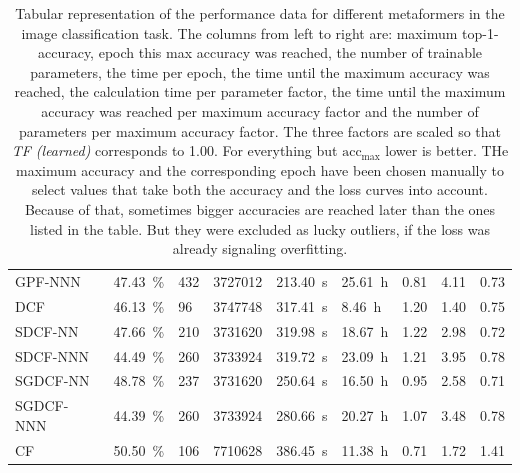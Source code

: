 \begin{table}[htbp]
{\begin{tabular}{l|llllllll}
            GPF-NNN & \SI{47.43}{\percent}  & \SI{432}{} & \SI{3727012}{} & \SI{213.40}{\second} & \SI{25.61}{\hour} & \SI{0.81}{} & \SI{4.11}{} & \SI{0.73}{} \\
            DCF & \SI{46.13}{\percent}  & \SI{96}{} & \SI{3747748}{} & \SI{317.41}{\second} & \SI{8.46}{\hour} & \SI{1.20}{} & \SI{1.40}{} & \SI{0.75}{} \\
            SDCF-NN & \SI{47.66}{\percent}  & \SI{210}{} & \SI{3731620}{} & \SI{319.98}{\second} & \SI{18.67}{\hour} & \SI{1.22}{} & \SI{2.98}{} & \SI{0.72}{} \\
            SDCF-NNN & \SI{44.49}{\percent}  & \SI{260}{} & \SI{3733924}{} & \SI{319.72}{\second} & \SI{23.09}{\hour} & \SI{1.21}{} & \SI{3.95}{} & \SI{0.78}{} \\
            SGDCF-NN & \SI{48.78}{\percent}  & \SI{237}{} & \SI{3731620}{} & \SI{250.64}{\second} & \SI{16.50}{\hour} & \SI{0.95}{} & \SI{2.58}{} & \SI{0.71}{} \\
            SGDCF-NNN & \SI{44.39}{\percent}  & \SI{260}{} & \SI{3733924}{} & \SI{280.66}{\second} & \SI{20.27}{\hour} & \SI{1.07}{} & \SI{3.48}{} & \SI{0.78}{} \\
            CF & \SI{50.50}{\percent}  & \SI{106}{} & \SI{7710628}{} & \SI{386.45}{\second} & \SI{11.38}{\hour} & \SI{0.71}{} & \SI{1.72}{} & \SI{1.41}{} \\
            \bottomrule
        \end{tabular}
    }
    \vspace{0.1cm}
    \caption{Tabular representation of the performance data for different metaformers in the image classification task.
            The columns from left to right are: maximum top-1-accuracy, epoch this max accuracy was reached, the number of trainable parameters, the time per epoch, the time until the maximum accuracy was reached, the calculation time per parameter factor, the time until the maximum accuracy was reached per maximum accuracy factor and the number of parameters per maximum accuracy factor.
            The three factors are scaled so that \emph{TF (learned)} corresponds to \SI{1.00}{}. For everything but $\mathrm{acc}_\mathrm{max}$ lower is better. THe maximum accuracy and the corresponding epoch have been chosen manually to select values that take both the accuracy and the loss curves into account. Because of that, sometimes bigger accuracies are reached later than the ones listed in the table.
            But they were excluded as lucky outliers, if the loss was already signaling overfitting.
    }
    \label{table:overall-comparison-data}
\end{table}
